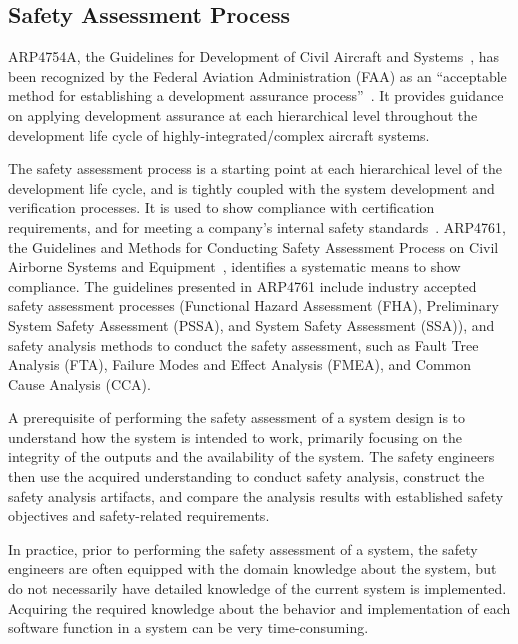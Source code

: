 \subsection{Safety Assessment Process}
\label{subsec:process}

ARP4754A, the Guidelines for Development of Civil Aircraft and Systems~\cite{SAE:ARP4754A}, has been recognized by the Federal Aviation Administration (FAA) as an ``acceptable method for establishing a development assurance process''~\cite{AC:20-174}. It provides guidance on applying development assurance at each hierarchical level throughout the development life cycle of highly-integrated/complex aircraft systems.


The safety assessment process is a starting point at each hierarchical level of the development life cycle, and is tightly coupled with the system development and verification processes. It is used to show compliance with certification requirements, and for meeting a company's internal safety standards~\cite{SAE:ARP4754A}. ARP4761, the Guidelines and Methods for Conducting Safety Assessment Process on Civil Airborne Systems and Equipment~\cite{SAE:ARP4761},  identifies a systematic means to show compliance. The guidelines presented in ARP4761 include industry accepted safety assessment processes (Functional Hazard Assessment (FHA), Preliminary System Safety Assessment (PSSA), and System Safety Assessment (SSA)), and safety analysis methods to conduct the safety assessment, 
such as Fault Tree Analysis (FTA), Failure Modes and Effect Analysis (FMEA), and Common Cause Analysis (CCA).

A prerequisite of performing the safety assessment of a system design is to understand how the system is intended to work, primarily focusing on the integrity of the outputs and the availability of the system. The safety engineers then use the acquired understanding to conduct safety analysis, construct the safety analysis artifacts, and compare the analysis results with established safety objectives and safety-related requirements. 

In practice, prior to performing the safety assessment of a system, the safety engineers are often equipped with the domain knowledge about the system, but do not necessarily have detailed knowledge of the current system is implemented. Acquiring the required knowledge about the behavior and implementation of each software function in a system can be very time-consuming. 


